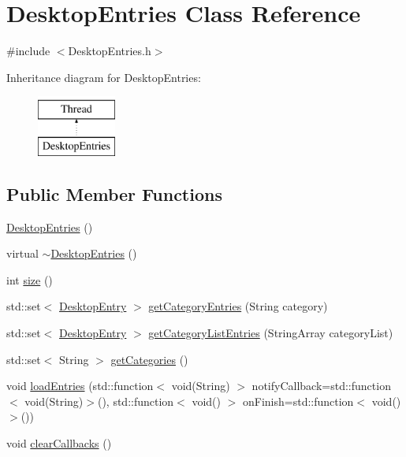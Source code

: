 \hypertarget{classDesktopEntries}{}\section{Desktop\+Entries Class Reference}
\label{classDesktopEntries}


{\ttfamily \#include $<$Desktop\+Entries.\+h$>$}

Inheritance diagram for Desktop\+Entries\+:\begin{figure}[H]
\begin{center}
\leavevmode
\includegraphics[height=2.000000cm]{classDesktopEntries}
\end{center}
\end{figure}
\subsection*{Public Member Functions}
\begin{DoxyCompactItemize}
\item 
\mbox{\hyperlink{classDesktopEntries_a99529c8954741328beed7ae78dc6b285}{Desktop\+Entries}} ()
\item 
virtual \mbox{\hyperlink{classDesktopEntries_a28a96ba644a65f67d75791b5ef34c385}{$\sim$\+Desktop\+Entries}} ()
\item 
int \mbox{\hyperlink{classDesktopEntries_a03a12d03f4b47e7bff920df1a29e7afe}{size}} ()
\item 
std\+::set$<$ \mbox{\hyperlink{classDesktopEntry}{Desktop\+Entry}} $>$ \mbox{\hyperlink{classDesktopEntries_a4c6b03297e85398db665df5df63fd168}{get\+Category\+Entries}} (String category)
\item 
std\+::set$<$ \mbox{\hyperlink{classDesktopEntry}{Desktop\+Entry}} $>$ \mbox{\hyperlink{classDesktopEntries_acc37ea433350d3be03a4665a14ce8b97}{get\+Category\+List\+Entries}} (String\+Array category\+List)
\item 
std\+::set$<$ String $>$ \mbox{\hyperlink{classDesktopEntries_ae3fadcd522793a38145d0815143532d9}{get\+Categories}} ()
\item 
void \mbox{\hyperlink{classDesktopEntries_a719f4190cf4c0fcc9edb807c8b5814ba}{load\+Entries}} (std\+::function$<$ void(String) $>$ notify\+Callback=std\+::function$<$ void(String)$>$(), std\+::function$<$ void() $>$ on\+Finish=std\+::function$<$ void()$>$())
\item 
void \mbox{\hyperlink{classDesktopEntries_aa72574a699efbc9b35f700b0e3f62bc3}{clear\+Callbacks}} ()
\end{DoxyCompactItemize}


